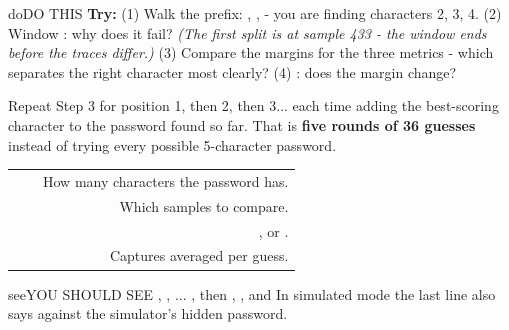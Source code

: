 \documentclass[11pt,letterpaper]{article}
\begin{document}
\vspace{4pt}

\begin{guidecallout}{do}{DO THIS}
\textbf{Try:} (1) Walk the prefix: , ,
 - you are finding characters 2, 3, 4. (2) Window : why does it
fail? \emph{(The first split is at sample 433 - the window ends before the traces differ.)} (3) Compare the margins
for the three metrics - which separates the right character most clearly? (4) : does the margin
change?
\end{guidecallout}

\Needspace{252pt}


Repeat Step 3 for position 1, then 2, then 3... each time adding the best-scoring character to the password found so
far. That is \textbf{five rounds of 36 guesses} instead of trying every possible 5-character password.

{\small{}
\begin{longtable}{|R{0.2391}|R{0.1522}|R{0.6087}|}
\hline
{} &  &  \\ \hline
\endhead
{} &  & How many characters the password has. \\ \hline
{} &  & Which samples to compare. \\ \hline
{} &  & ,  or . \\ \hline
{} &  & Captures averaged per guess. \\ \hline
\end{longtable}}

\vspace{4pt}


\begin{guidecallout}{see}{YOU SHOULD SEE}
, , ... , then ,
, and  In simulated mode the last line also says  against the simulator's
hidden password.
\end{guidecallout}
\end{document}
